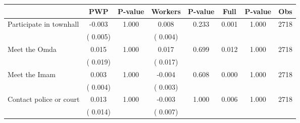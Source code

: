 
\begin{tabular}{l*{7}{c}}\hline&\multicolumn{1}{c}{PWP}&\multicolumn{1}{c}{P-value}&\multicolumn{1}{c}{Workers}&\multicolumn{1}{c}{P-value}&\multicolumn{1}{c}{Full}&\multicolumn{1}{c}{P-value}&\multicolumn{1}{c}{Obs} \\ \hline

 Participate in townhall       &             -0.003       &        1.000  &              0.008       &        0.233  &              0.001       &              1.000 &  2718 \\ 
                       &       (       0.005)             &                               &       (       0.004)                     &                               &                                               &                                &                      \\ 

 Meet the Omda       &              0.015       &        1.000  &              0.017       &        0.699  &              0.012       &              1.000 &  2718 \\ 
                       &       (       0.019)             &                               &       (       0.017)                     &                               &                                               &                                &                      \\ 

 Meet the Imam       &              0.003       &        1.000  &             -0.004       &        0.608  &              0.000       &              1.000 &  2718 \\ 
                       &       (       0.004)             &                               &       (       0.003)                     &                               &                                               &                                &                      \\ 

 Contact police or court       &              0.013       &        1.000  &             -0.003       &        1.000  &              0.006       &              1.000 &  2718 \\ 
                       &       (       0.014)             &                               &       (       0.007)                     &                               &                                               &                                &                      \\ 


\end{tabular}
